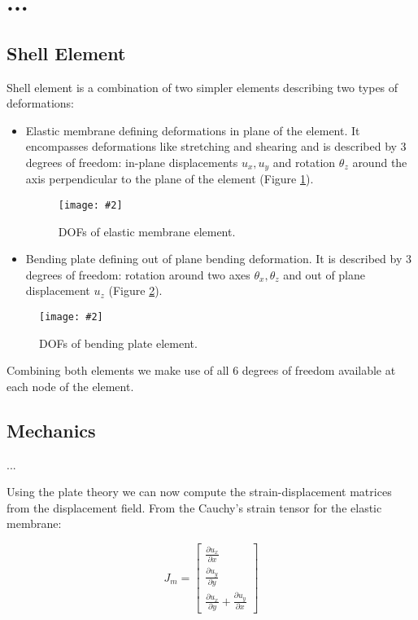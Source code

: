 \documentclass{egpubl}
\newcommand{\deriv}[2]{\frac{\partial #1}{\partial #2}}
\newcommand{\Figure}[3]{%
\begin{figure}[htb]
  \centering
  \texttt{[image: \#2]}
  \caption{\label{fig-#2}#3}
\end{figure}}
\begin{document}



\section{...} %

\subsection{Shell Element}

Shell element is a combination of two simpler elements describing two types
of deformations:

\begin{itemize}

    \item Elastic membrane defining deformations in plane of the
    element. It encompasses deformations like stretching and shearing and
    is described by 3 degrees of freedom: in-plane displacements $u_x, u_y$
    and rotation $\theta_z$ around the axis perpendicular to the plane of
    the element (Figure \ref{fig-membrane}).

\Figure{0.8\linewidth}{membrane}
{DOFs of elastic membrane element.}


    \item Bending plate defining out of plane bending deformation. It is
    described by 3 degrees of freedom: rotation around two axes $\theta_x,
    \theta_z$ and out of plane displacement $u_z$ (Figure \ref{fig-plate}).

\end{itemize}

\Figure{0.8\linewidth}{plate}
{DOFs of bending plate element.}

Combining both elements we make use of all 6 degrees of freedom available
at each node of the element.


\subsection{Mechanics} %

...

Using the plate theory we can now compute the strain-displacement matrices
from the displacement field. From the Cauchy's strain tensor for the
elastic membrane:

\begin{equation}\label{eq-cauchy}
    J_m = \left[ \begin{matrix}
        \deriv{u_x}{x} \\
        \deriv{u_y}{y} \\
        \deriv{u_x}{y} + \deriv{u_y}{x}
    \end{matrix} \right]
\end{equation}
\end{document}
